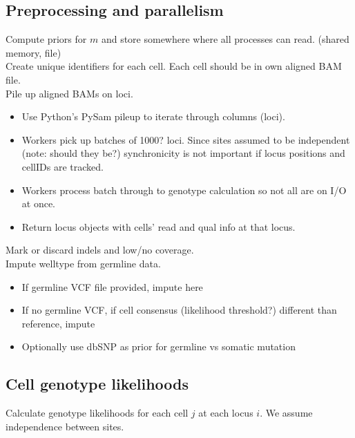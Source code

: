 \documentclass[../main.tex]{subfiles}
\begin{document}



\subsection{Preprocessing and parallelism}
Compute priors for $m$ and store somewhere where all processes can read. (shared memory, file)\\[1em]
Create unique identifiers for each cell. Each cell should be in own aligned BAM file.\\[1em]
Pile up aligned BAMs on loci.
\begin{itemize}
    \item Use Python's PySam pileup to iterate through columns (loci).
    \item Workers pick up batches of 1000? loci. Since sites assumed to be independent (note: should they be?) synchronicity is not important if locus positions and cellIDs are tracked.
    \item Workers process batch through to genotype calculation so not all are on I/O at once.
    \item Return locus objects with cells' read and qual info at that locus.
\end{itemize}
\vspace{1em}
Mark or discard indels and low/no coverage.\\[1em]
Impute welltype from germline data.
\begin{itemize}
    \item If germline VCF file provided, impute here
    \item If no germline VCF, if cell consensus (likelihood threshold?) different than reference, impute
    \item Optionally use dbSNP as prior for germline vs somatic mutation
\end{itemize}
\subsection{Cell genotype likelihoods}
Calculate genotype likelihoods for each cell $j$ at each locus $i$. We assume independence between sites.
\end{document}
